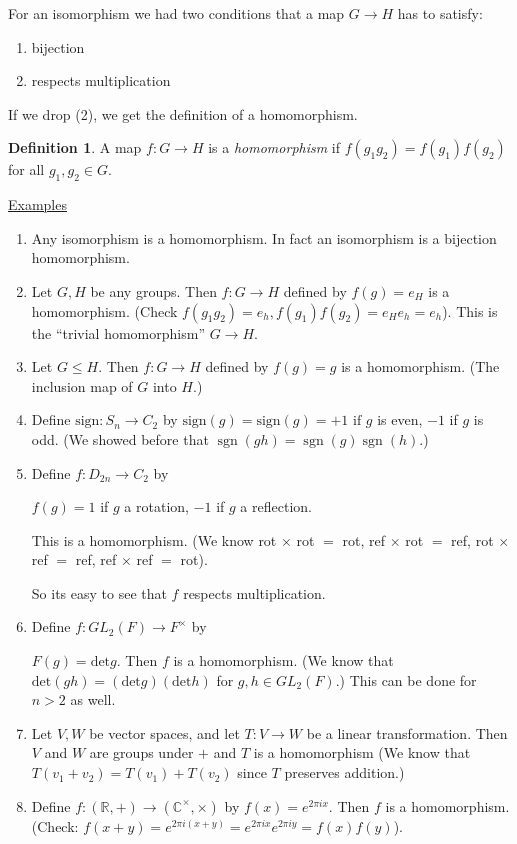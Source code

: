 \documentclass{article}
\theoremstyle{definition}
\newtheorem{definition}{Definition}[section]
\DeclareMathOperator{\sgn}{sgn}
\begin{document}
For an isomorphism we had two conditions that a map $G \rightarrow H$ has to satisfy:

\begin{enumerate}
  \item bijection
  \item respects multiplication
\end{enumerate}

If we drop (2), we get the definition of a homomorphism.

\begin{definition}
  A map $f:G \rightarrow H$ is a \emph{homomorphism} if $f(g_1 g_2)=f(g_1)f(g_2)$ for all $g_1,g_2 \in G.$
\end{definition}

\underline{Examples}
\begin{enumerate}
  \item Any isomorphism is a homomorphism. In fact an isomorphism is a bijection homomorphism.
  \item Let $G,H$ be any groups. Then
    $f : G \rightarrow H$ defined by $f(g) = e_H$ is a homomorphism. (Check $f(g_1 g_2)=e_h, f(g_1)f(g_2)=e_He_h = e_h$). This is the ``trivial homomorphism'' $G \rightarrow H.$
  \item Let $G \leq H$. Then $f:G\rightarrow H$ defined by $f(g)=g$ is a homomorphism. (The inclusion map of $G$ into $H$.)
  \item Define $\text{sign}:S_n \rightarrow C_2$ by $\text{sign}(g)=\text{sign}(g)=+1 \text{ if } g $ is even, $-1$ if $g$ is odd. (We showed before that $\sgn(gh)=\sgn(g)\sgn(h)$.)
  \item Define $f:D_{2n} \rightarrow C_2$ by 

    $f(g)=1$ if $g$ a rotation, $-1$ if $g$ a reflection.

    This is a homomorphism. (We know rot $\times$ rot $=$ rot, ref $\times$ rot $=$ ref, rot $\times$ ref $=$ ref, ref $\times$ ref $=$ rot).

    So its easy to see that $f$ respects multiplication.

  \item Define $f:GL_2(F) \rightarrow F^\times$ by

    $F(g) = \text{det}g$. Then $f$ is a homomorphism. 
    (We know that $\text{det}(gh)=(\text{det}g)(\text{det}h)$ for $g,h \in GL_2(F)$.) This can be done for $n>2$ as well.
  \item Let $V,W$ be vector spaces, and let $T:V \rightarrow W$ be a linear transformation. Then $V$ and $W$ are groups under $+$ and $T$ is a homomorphism (We know that $T(v_1 + v_2)=T(v_1)+T(v_2)$ since $T$ preserves addition.) 
  \item Define $f: (\mathbb{R},+)\rightarrow (\mathbb{C}^\times,\times)$ by $f(x)=e^{2 \pi i x}.$ Then $f$ is a homomorphism. (Check: $f(x+y)=e^{2\pi i (x+y)}=e^{2\pi i x}e^{2 \pi i y}=f(x)f(y)$).
\end{enumerate}
\end{document}
